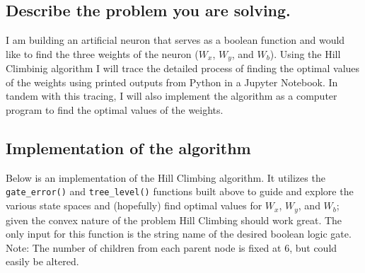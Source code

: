 \documentclass[11pt]{article}
\begin{document}
\hypertarget{describe-the-problem-you-are-solving.}{%
\subsection{Describe the problem you are
solving.}\label{describe-the-problem-you-are-solving.}}

I am building an artificial neuron that serves as a boolean function and
would like to find the three weights of the neuron (\(W_x\), \(W_y\),
and \(W_b\)). Using the Hill Climbinig algorithm I will trace the
detailed process of finding the optimal values of the weights using
printed outputs from Python in a Jupyter Notebook. In tandem with this
tracing, I will also implement the algorithm as a computer program to
find the optimal values of the weights.

    \hypertarget{implementation-of-the-algorithm}{%
\subsection{Implementation of the
algorithm}\label{implementation-of-the-algorithm}}

Below is an implementation of the Hill Climbing algorithm. It utilizes
the \texttt{gate\_error()} and \texttt{tree\_level()} functions built
above to guide and explore the various state spaces and (hopefully) find
optimal values for \(W_x\), \(W_y\), and \(W_b\); given the convex
nature of the problem Hill Climbing should work great. The only input
for this function is the string name of the desired boolean logic gate.
Note: The number of children from each parent node is fixed at 6, but
could easily be altered.
\end{document}
